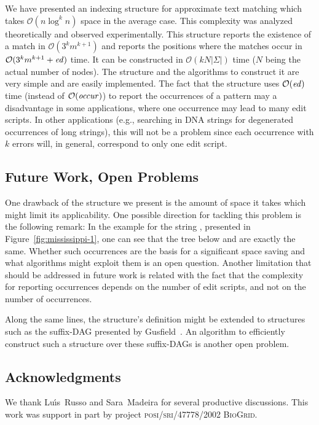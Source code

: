 We have presented an indexing structure for approximate text matching which takes $\mathcal{O}(n\log^k n)$ space in the average case. This complexity was analyzed theoretically and observed experimentally. This structure reports the existence of a match in  $\mathcal{O}(3^k m^{k+1})$ and reports the positions where the matches occur in  $\mathcal{O}(3^k m^{k+1} + {\it ed})$ time.  It can be constructed in $\mathcal{O}(kN|\Sigma|)$ time ($N$ being the actual number of nodes). The structure and the algorithms to construct it are very simple and are easily implemented.  The fact that the structure uses $\mathcal{O}({\it ed})$ time (instead of $\mathcal{O}({\it occur})$) to report the occurrences of a pattern may a disadvantage in some applications, where one occurrence may lead to many edit scripts. In other applications (e.g., searching in DNA strings for degenerated occurrences of long strings), this will not be a problem since each occurrence with $k$ errors will, in general, correspond to only one edit script.  

\subsection{Future Work, Open Problems}\label{sec:future}

One drawback of the structure we present is the amount of space it takes which might limit its applicability. One possible direction for tackling this problem is the following remark: In the example for the string , presented in Figure~\ref{fig:mississippi-1}, one can see that the tree below  and  are exactly the same. Whether such occurrences are the basis for a significant space saving and what algorithms might exploit them is an open question.  Another limitation that should be addressed in future work is related with the fact that the complexity for reporting occurrences depends on the number of edit scripts, and not on the number of occurrences.

Along the same lines, the structure's definition might be extended to structures such as the suffix-DAG presented by Gusfield~\cite[\S\,7.7]{gusfield:algorithms}. An algorithm to efficiently construct such a structure over these suffix-DAGs is another open problem. 

\subsection{Acknowledgments}
%
We thank Lu\'{\i}s~Russo and Sara~Madeira for several productive discussions. This work was support in part by project \textsc{posi/sri/47778/2002 BioGrid}.
